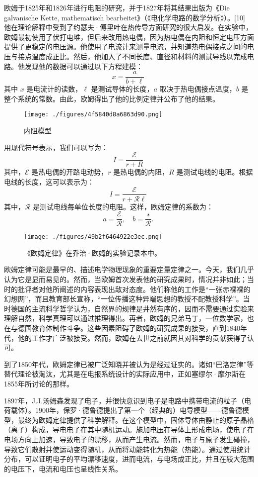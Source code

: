 欧姆于1825年和1826年进行电阻的研究，并于1827年将其结果出版为《Die galvanische Kette, mathematisch bearbeitet》（《电化学电路的数学分析》）。[10] 他在理论解释中受到了约瑟夫·傅里叶在热传导方面研究的很大启发。在实验中，欧姆最初使用了伏打电堆，但后来改用热电偶，因为热电偶在内阻和恒定电压方面提供了更稳定的电压源。他使用了电流计来测量电流，并知道热电偶接点之间的电压与接点温度成正比。然后，他加入了不同长度、直径和材料的测试导线以完成电路。他发现他的数据可以通过以下方程建模：
\[ x = \frac{a}{b + \ell}~\]
其中 \( x \) 是电流计的读数，\( \ell \) 是测试导体的长度，\( a \) 取决于热电偶接点温度，\( b \) 是整个系统的常数。由此，欧姆得出了他的比例定律并公布了他的结果。
\begin{figure}[ht]
\centering
\texttt{[image: ./figures/4f5840d8a6863d90.png]}
\caption{内阻模型} \label{fig_OuMu_3}
\end{figure}
用现代符号表示，我们可以写为：
\[
I = \frac{\mathcal{E}}{r + R}~
\]
其中，\(\mathcal{E}\) 是热电偶的开路电动势，\(r\) 是热电偶的内阻，\(R\) 是测试电线的电阻。根据电线的长度，这可以表示为：
\[
I = \frac{\mathcal{E}}{r + \mathcal{R}\ell}~
\]
其中，\(\mathcal{R}\) 是测试电线每单位长度的电阻。这样，欧姆定律的系数为：
\[
a = \frac{\mathcal{E}}{\mathcal{R}}, \quad b = \frac{\mathcal{r}}{\mathcal{R}}.~
\]
\begin{figure}[ht]
\centering
\texttt{[image: ./figures/49b2f6464922e3ec.png]}
\caption{《欧姆定律》在乔治·欧姆的实验记录本中。} \label{fig_OuMu_4}
\end{figure}
欧姆定律可能是最早的、描述电学物理现象的重要定量定律之一。今天，我们几乎认为它是显而易见的。然而，当欧姆首次发表他的研究成果时，情况并非如此；当时的批评者对他所阐述的内容表现出敌对态度。他们称他的工作是“一张赤裸裸的幻想网”，而且教育部长宣称，“一位传播这种异端思想的教授不配教授科学”。当时德国的主流科学哲学认为，自然界的规律是井然有序的，因而不需要通过实验来理解自然，科学真理可以通过推理得出。再者，欧姆的兄弟马丁，一位数学家，也在与德国教育体制作斗争。这些因素阻碍了欧姆的研究成果的接受，直到1840年代，他的工作才广泛被接受。然而，欧姆在去世之前就因其对科学的贡献获得了认可。

到了1850年代，欧姆定律已被广泛知晓并被认为是经过证实的。诸如“巴洛定律”等替代理论被淘汰，尤其是在电报系统设计的实际应用中，正如塞缪尔·摩尔斯在1855年所讨论的那样。

1897年，J.J.汤姆森发现了电子，并很快意识到电子是电路中携带电流的粒子（电荷载体）。1900年，保罗·德鲁德提出了第一个（经典的）电导模型——德鲁德模型，最终为欧姆定律提供了科学解释。在这个模型中，固体导体由静止的原子晶格（离子）构成，导电电子在其中随机运动。施加电压在导体上形成电场，使电子在电场方向上加速，导致电子的漂移，从而产生电流。然而，电子与原子发生碰撞，导致它们散射并使运动变得随机，从而将动能转化为热能（热能）。通过使用统计分布，可以证明电子的平均漂移速度，进而电流，与电场成正比，并且在较大范围的电压下，电流和电压也呈线性关系。

